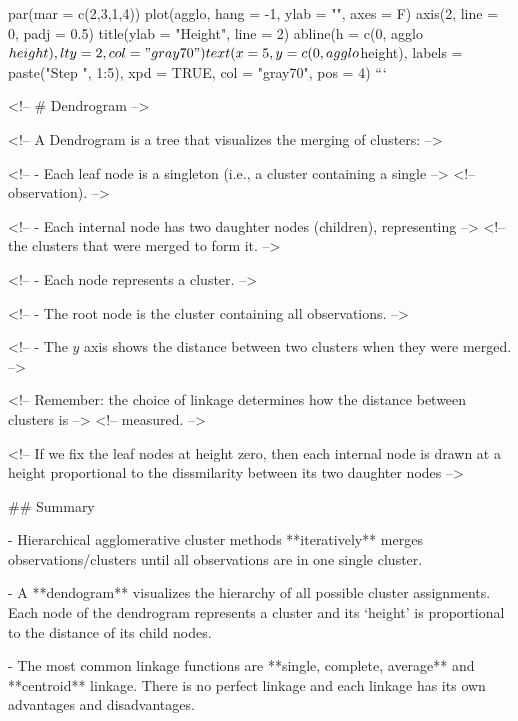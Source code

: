 par(mar = c(2,3,1,4))
plot(agglo, hang = -1, ylab = "", axes = F)
axis(2, line = 0, padj = 0.5)
title(ylab = "Height", line = 2)
abline(h = c(0, agglo$height), lty = 2, col = "gray70")
text(x = 5, y = c(0, agglo$height), labels = paste("Step ", 1:5), xpd = TRUE, col = "gray70", pos = 4)
```

<!-- # Dendrogram -->

<!-- A Dendrogram is a tree that visualizes the merging of clusters: -->

<!-- - Each leaf node is a singleton (i.e., a cluster containing a single  -->
<!--   observation). -->

<!-- - Each internal node has two daughter nodes (children), representing -->
<!--   the clusters that were merged to form it.  -->

<!-- - Each node represents a cluster. -->

<!-- - The root node is the cluster containing all observations. -->

<!-- - The $y$ axis shows the distance between two clusters when they were merged. -->

<!-- Remember: the choice of linkage determines how the distance between clusters is  -->
<!-- measured.  -->

<!-- If we fix the leaf nodes at height zero, then each internal node is
drawn at a height proportional to the dissmilarity between
its two daughter nodes -->

## Summary

- Hierarchical agglomerative cluster methods **iteratively** merges observations/clusters until all observations are in one single cluster.

- A **dendogram** visualizes the hierarchy of all possible cluster assignments.
Each node of the dendrogram represents a cluster and its `height' is proportional to the distance of its child nodes.

- The most common linkage functions are **single, complete, average** and **centroid** linkage.
There is no perfect linkage and each linkage has its own advantages and disadvantages.
